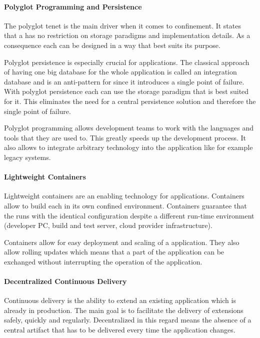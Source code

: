 \paragraph{Polyglot Programming and Persistence}

The polyglot tenet is the main driver when it comes to \ms{} confinement. It
states that a \ms{} has no restriction on storage paradigms and implementation
details. As a consequence each \ms{} can be designed in a way that best suits
its purpose.

Polyglot persistence is especially crucial for \ms{} applications. The classical
approach of having one big database for the whole application is called an
integration database and is an anti-pattern for \mss{} since it introduces a
single point of failure. With polyglot persistence each \ms{} can use the
storage paradigm that is best suited for it. This eliminates the need for a
central persistence solution and therefore the single point of failure.

Polyglot programming allows development teams to work with the languages and
tools that they are used to. This greatly speeds up the development process. It
also allows to integrate arbitrary technology into the application like for
example legacy systems.

\paragraph{Lightweight Containers}

Lightweight containers are an enabling technology for \ms{} applications.
Containers allow to build each \ms{} in its own confined environment. Containers
guarantee that the \ms{} runs with the identical configuration despite a
different run-time environment (developer PC, build and test server, cloud
provider infrastructure).

Containers allow for easy deployment and scaling of a \ms{} application. They
also allow rolling updates which means that a part of the application can be
exchanged without interrupting the operation of the application.

\paragraph{Decentralized Continuous Delivery}

Continuous delivery is the ability to extend an existing \ms{} application which
is already in production. The main goal is to facilitate the delivery of
extensions safely, quickly and regularly. Decentralized in this regard means the
absence of a central artifact that has to be delivered every time the
application changes.

